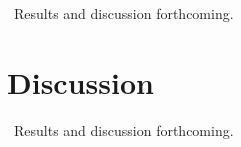 \documentclass{article}
\begin{document}
~Results and discussion forthcoming.~
	

\section{Discussion}\label{sec:discussion}

~Results and discussion forthcoming.~





%
%
%
%
\end{document}
